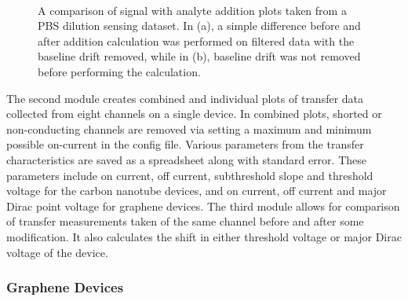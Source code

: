 \documentclass[
  letterpaper,
  DIV=11,
  numbers=noendperiod]{scrartcl}
\begin{document}
\begin{figure}
\begin{minipage}[t]{0.01\linewidth}
{\centering 

~

}

\end{minipage}%

\caption{\label{fig-spaa-plot-comparison}A comparison of signal with
analyte addition plots taken from a PBS dilution sensing dataset. In
(a), a simple difference before and after addition calculation was
performed on filtered data with the baseline drift removed, while in
(b), baseline drift was not removed before performing the calculation.}

\end{figure}

The second module creates combined and individual plots of transfer data
collected from eight channels on a single device. In combined plots,
shorted or non-conducting channels are removed via setting a maximum and
minimum possible on-current in the config file. Various parameters from
the transfer characteristics are saved as a spreadsheet along with
standard error. These parameters include on current, off current,
subthreshold slope and threshold voltage for the carbon nanotube
devices, and on current, off current and major Dirac point voltage for
graphene devices. The third module allows for comparison of transfer
measurements taken of the same channel before and after some
modification. It also calculates the shift in either threshold voltage
or major Dirac voltage of the device.

\hypertarget{graphene-devices}{%
\subsubsection{Graphene Devices}\label{graphene-devices}}
\end{document}
